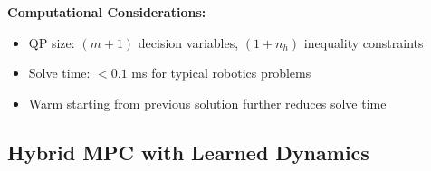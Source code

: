 \textbf{Computational Considerations:}
\begin{itemize}
    \item QP size: $(m+1)$ decision variables, $(1 + n_h)$ inequality constraints
    \item Solve time: $<0.1$ ms for typical robotics problems
    \item Warm starting from previous solution further reduces solve time
\end{itemize}

\subsection{Hybrid MPC with Learned Dynamics}
\label{subsec:alg_hybrid_mpc}

